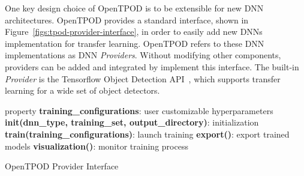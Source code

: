 One key design choice of OpenTPOD is to be extensible for new DNN architectures.
OpenTPOD provides a standard interface, shown in
Figure~\ref{figs:tpod-provider-interface}, in order to easily add new DNNs
implementation for transfer learning. OpenTPOD refers to these DNN implementations
as DNN \textit{Providers}. Without modifying other components, providers can be
added and integrated by implement this interface. The built-in \textit{Provider}
is the Tensorflow Object Detection API~\cite{tfod2019}, which supports transfer
learning for a wide set of object detectors.


\begin{algorithm}
  \SetAlgoLined
  property \textbf{training\_configurations}: user customizable hyperparameters\;
  \textbf{init(dnn\_type, training\_set, output\_directory)}: initialization\;
  \textbf{train(training\_configurations)}: launch training\;
  \textbf{export()}: export trained models\;
  \textbf{visualization()}: monitor training process\;
  \caption{OpenTPOD Provider Interface}
  \label{figs:tpod-provider-interface}
\end{algorithm}